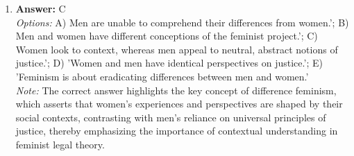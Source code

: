 \documentclass[12pt]{article}
\begin{document}
\begin{enumerate}[label=\arabic*.]
\\ \textit{Options:} A) Command; B) Sociological; C) Historical; D) Interpretive; E) Analytical
\\ \textit{Note:} The Historical School of jurisprudence posits that law evolves from the customs and traditions of society, reflecting its historical context and collective values over time.
\item \textbf{Answer:} C
\\ \textit{Options:} A) Men are unable to comprehend their differences from women.'; B) Men and women have different conceptions of the feminist project.'; C) Women look to context, whereas men appeal to neutral, abstract notions of justice.'; D) 'Women and men have identical perspectives on justice.'; E) 'Feminism is about eradicating differences between men and women.'
\\ \textit{Note:} The correct answer highlights the key concept of difference feminism, which asserts that women's experiences and perspectives are shaped by their social contexts, contrasting with men's reliance on universal principles of justice, thereby emphasizing the importance of contextual understanding in feminist legal theory.
\end{enumerate}
\end{document}
